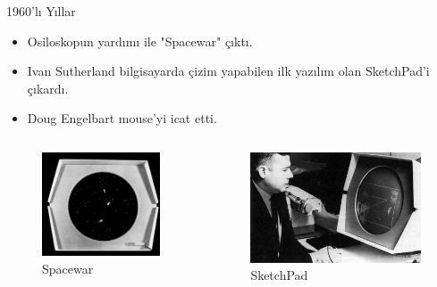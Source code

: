 \documentclass{beamer}
\begin{document}
\begin{frame}[fragile]{1960'lı Yıllar}
\begin{itemize}
\item Osiloskopun yardımı ile "Spacewar" çıktı.
\item Ivan Sutherland bilgisayarda çizim yapabilen ilk yazılım olan SketchPad'i çıkardı.
\item Doug Engelbart mouse'yi icat etti.
\end{itemize}
\begin{columns}
\begin{column}{0.3\textwidth}
\begin{figure}
\includegraphics[width=\textwidth]{spacewar.jpg}
\caption{Spacewar}
\end{figure}
\end{column}
\begin{column}{0.4\textwidth}
\begin{figure}
\includegraphics[width=\textwidth]{ıvansutherland.jpg}
\caption{SketchPad}
\end{figure}
\end{column}
\end{columns}
\end{frame}
\end{document}
